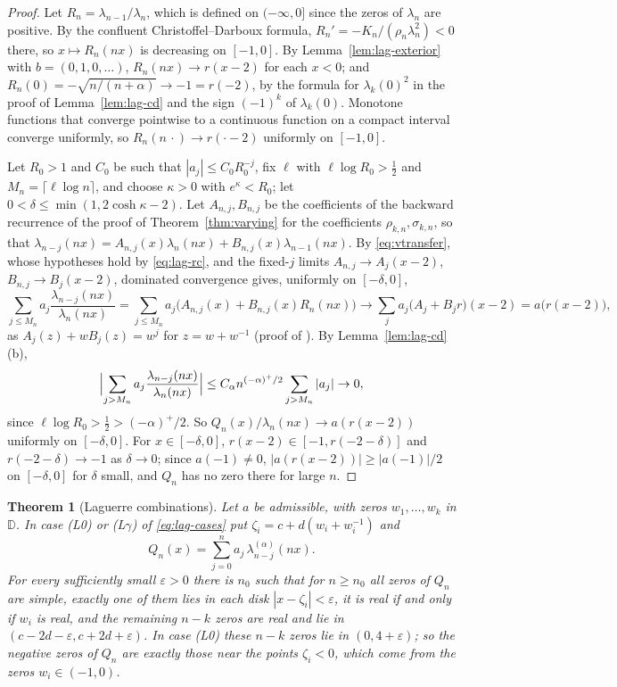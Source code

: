 \documentclass[11pt]{amsart}
\newtheorem{theorem}{Theorem}[section]
\theoremstyle{definition}
\theoremstyle{remark}
\numberwithin{equation}{section}
\newcommand{\D}{\mathbb{D}}
\newcommand{\eps}{\varepsilon}
\begin{document}
\begin{proof}
Let $R_n=\lambda_{n-1}/\lambda_n$, which is defined on $(-\infty,0]$ since the zeros of $\lambda_n$ are positive. By the confluent Christoffel--Darboux formula, $R_n'=-K_n/(\rho_n\lambda_n^2)<0$ there, so $x\mapsto R_n(nx)$ is decreasing on $[-1,0]$. By Lemma~\ref{lem:lag-exterior} with $b=(0,1,0,\dots)$, $R_n(nx)\to r(x-2)$ for each $x<0$; and $R_n(0)=-\sqrt{n/(n+\alpha)}\to-1=r(-2)$, by the formula for $\lambda_k(0)^2$ in the proof of Lemma~\ref{lem:lag-cd} and the sign $(-1)^k$ of $\lambda_k(0)$. Monotone functions that converge pointwise to a continuous function on a compact interval converge uniformly, so $R_n(n\,\cdot)\to r(\cdot-2)$ uniformly on $[-1,0]$.

Let $R_0>1$ and $C_0$ be such that $|a_j|\le C_0R_0^{-j}$, fix $\ell$ with $\ell\log R_0>\frac12$ and $M_n=\lceil\ell\log n\rceil$, and choose $\kappa>0$ with $e^\kappa<R_0$; let $0<\delta\le\min(1,2\cosh\kappa-2)$. Let $A_{n,j},B_{n,j}$ be the coefficients of the backward recurrence of the proof of Theorem~\ref{thm:varying} for the coefficients $\rho_{k,n},\sigma_{k,n}$, so that $\lambda_{n-j}(nx)=A_{n,j}(x)\lambda_n(nx)+B_{n,j}(x)\lambda_{n-1}(nx)$. By \eqref{eq:vtransfer}, whose hypotheses hold by \eqref{eq:lag-rc}, and the fixed-$j$ limits $A_{n,j}\to A_j(x-2)$, $B_{n,j}\to B_j(x-2)$, dominated convergence gives, uniformly on $[-\delta,0]$,
\[
\sum_{j\le M_n}a_j\frac{\lambda_{n-j}(nx)}{\lambda_n(nx)}=\sum_{j\le M_n}a_j\bigl(A_{n,j}(x)+B_{n,j}(x)R_n(nx)\bigr)\to\sum_ja_j\bigl(A_j+B_jr\bigr)(x-2)=a\bigl(r(x-2)\bigr),
\]
as $A_j(z)+wB_j(z)=w^j$ for $z=w+w^{-1}$ (proof of \cite[Lemma~\ref{M-lem:limit}]{Main}). By Lemma~\ref{lem:lag-cd}(b),
\[
\Bigl|\sum_{j>M_n}a_j\frac{\lambda_{n-j}(nx)}{\lambda_n(nx)}\Bigr|\le C_\alpha n^{(-\alpha)^+/2}\sum_{j>M_n}|a_j|\to0,
\]
since $\ell\log R_0>\frac12>(-\alpha)^+/2$. So $Q_n(x)/\lambda_n(nx)\to a(r(x-2))$ uniformly on $[-\delta,0]$. For $x\in[-\delta,0]$, $r(x-2)\in[-1,r(-2-\delta)]$ and $r(-2-\delta)\to-1$ as $\delta\to0$; since $a(-1)\ne0$, $|a(r(x-2))|\ge|a(-1)|/2$ on $[-\delta,0]$ for $\delta$ small, and $Q_n$ has no zero there for large $n$.
\end{proof}

\begin{theorem}[Laguerre combinations]\label{thm:lag-count}
Let $a$ be admissible, with zeros $w_1,\dots,w_k$ in $\D$. In case (L0) or (L$\gamma$) of \eqref{eq:lag-cases} put $\zeta_i=c+d(w_i+w_i^{-1})$ and
\[
Q_n(x)=\sum_{j=0}^{n}a_j\,\lambda^{(\alpha)}_{n-j}(nx).
\]
For every sufficiently small $\eps>0$ there is $n_0$ such that for $n\ge n_0$ all zeros of $Q_n$ are simple, exactly one of them lies in each disk $|x-\zeta_i|<\eps$, it is real if and only if $w_i$ is real, and the remaining $n-k$ zeros are real and lie in $(c-2d-\eps,c+2d+\eps)$. In case (L0) these $n-k$ zeros lie in $(0,4+\eps)$; so the negative zeros of $Q_n$ are exactly those near the points $\zeta_i<0$, which come from the zeros $w_i\in(-1,0)$.
\end{theorem}
\end{document}
